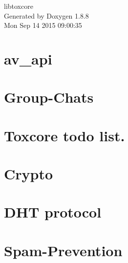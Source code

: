 \documentclass[twoside]{book}
\newcommand{\+}{\discretionary{\mbox{\scriptsize$\hookleftarrow$}}{}{}}
\newcommand{\clearemptydoublepage}{%
  \newpage{\pagestyle{empty}\cleardoublepage}%
}
\begin{document}
\hypersetup{pageanchor=false,
             bookmarks=true,
             bookmarksnumbered=true,
             pdfencoding=unicode
            }
\begin{titlepage}
\vspace*{7cm}
\begin{center}%
{\Large libtoxcore }\\
\vspace*{1cm}
{\large Generated by Doxygen 1.8.8}\\
\vspace*{0.5cm}
{\small Mon Sep 14 2015 09:00:35}\\
\end{center}
\end{titlepage}
\clearemptydoublepage
\tableofcontents
\clearemptydoublepage
{}
\hypersetup{pageanchor=true}

\chapter{av\+\_\+api}
\label{md_docs_av_api}
\hypertarget{md_docs_av_api}{}

\chapter{Group-\/\+Chats}
\label{md_docs__group-_chats}
\hypertarget{md_docs__group-_chats}{}

\chapter{Toxcore todo list.}
\label{md_docs__t_o_d_o}
\hypertarget{md_docs__t_o_d_o}{}

\chapter{Crypto}
\label{md_docs_updates__crypto}
\hypertarget{md_docs_updates__crypto}{}

\chapter{D\+H\+T protocol}
\label{md_docs_updates__d_h_t}
\hypertarget{md_docs_updates__d_h_t}{}

\chapter{Spam-\/\+Prevention}
\label{md_docs_updates__spam-_prevention}
\hypertarget{md_docs_updates__spam-_prevention}{}

\end{document}
